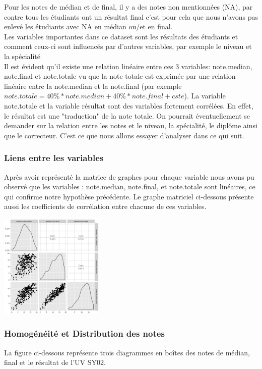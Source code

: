 \documentclass[10pt]{article}
\begin{document}
	Pour les notes de médian et de final, il y a des notes non mentionnées (NA), par contre tous les étudiants ont un résultat final c'est pour cela que nous n'avons pas enlevé les étudiants avec NA en médian ou/et en final.\\
	Les variables importantes dans ce dataset sont les résultats des étudiants et comment ceux-ci sont influencés par d'autres variables, par exemple le niveau et la spécialité\\
	Il est évident qu'il existe une relation linéaire entre ces 3 variables: note.median, note.final et note.totale vu que la note totale est exprimée par une relation linéaire entre la note.median et la note.final (par exemple $note.totale = 40\% * note.median + 40\% * note.final + cste$). La variable note.totale et la variable résultat sont des variables fortement corrélées. En effet, le résultat est une "traduction" de la note totale. On pourrait éventuellement se demander sur la relation entre les notes et le niveau, la spécialité, le diplôme ainsi que le correcteur. C'est ce que nous allons essayer d'analyser dans ce qui suit. 
	
	\subsubsection{Liens entre les variables}
	Après avoir représenté la matrice de graphes pour chaque variable nous avons pu observé que les variables : note.median, note.final, et note.totale sont linéaires, ce qui confirme notre hypothèse précédente. Le graphe matriciel ci-dessous présente aussi les coefficients de corrélation entre chacune de ces variables.
	
	\begin{center}
		\includegraphics[width=50mm]{Figures/Notes/corr_notes.jpg}
		\label{fig:multiplot_notes}
	\end{center}
	
	
	\subsubsection{Homogénéité et Distribution des notes}
	La figure ci-dessous représente trois diagrammes en boîtes des notes de médian, final et le résultat de l'UV SY02. 
	
\end{document}
